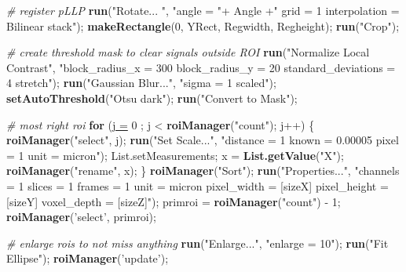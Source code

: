 \documentclass[11pt,singlespacinge,twoside]{reedthesis} %
\newenvironment{Shaded}{}{}
\newcommand{\CommentTok}[1]{\textit{#1}}
\newcommand{\ControlFlowTok}[1]{\textbf{#1}}
\newcommand{\DataTypeTok}[1]{\underline{#1}}
\newcommand{\DecValTok}[1]{#1}
\newcommand{\KeywordTok}[1]{\textbf{#1}}
\newcommand{\NormalTok}[1]{#1}
\newcommand{\OperatorTok}[1]{#1}
\newcommand{\StringTok}[1]{#1}
\theoremstyle{definition}
\theoremstyle{definition}
\theoremstyle{definition}
\theoremstyle{remark}
\begin{document}
\scriptsize
\begin{Shaded}
\begin{Highlighting}[numbers=left,,]
\CommentTok{# register pLLP}
    \KeywordTok{run}\NormalTok{(}\StringTok{"Rotate... "}\NormalTok{, }\StringTok{"angle = "}\OperatorTok{+}\StringTok{ }\NormalTok{Angle }\OperatorTok{+}\StringTok{" grid = 1 interpolation = Bilinear stack"}\NormalTok{);}
    \KeywordTok{makeRectangle}\NormalTok{(}\DecValTok{0}\NormalTok{, YRect, Regwidth, Regheight);}
    \KeywordTok{run}\NormalTok{(}\StringTok{"Crop"}\NormalTok{);}

\CommentTok{# create threshold mask to clear signals outside ROI}
    \KeywordTok{run}\NormalTok{(}\StringTok{"Normalize Local Contrast"}\NormalTok{, }\StringTok{"block_radius_x = 300 block_radius_y = 20 standard_deviations = 4 stretch"}\NormalTok{);}
    \KeywordTok{run}\NormalTok{(}\StringTok{"Gaussian Blur..."}\NormalTok{, }\StringTok{"sigma = 1 scaled"}\NormalTok{);}
    \KeywordTok{setAutoThreshold}\NormalTok{(}\StringTok{"Otsu dark"}\NormalTok{);}
    \KeywordTok{run}\NormalTok{(}\StringTok{"Convert to Mask"}\NormalTok{);}

\CommentTok{# most right roi}
    \ControlFlowTok{for}\NormalTok{ (}\DataTypeTok{j =} \DecValTok{0}\NormalTok{ ; j }\OperatorTok{<}\StringTok{ }\KeywordTok{roiManager}\NormalTok{(}\StringTok{"count"}\NormalTok{); j}\OperatorTok{++}\NormalTok{) \{}
        \KeywordTok{roiManager}\NormalTok{(}\StringTok{"select"}\NormalTok{, j);}
        \KeywordTok{run}\NormalTok{(}\StringTok{"Set Scale..."}\NormalTok{, }\StringTok{"distance = 1 known = 0.00005 pixel = 1 unit = micron"}\NormalTok{);}
\NormalTok{        List.setMeasurements;}
\NormalTok{    x =}\StringTok{ }\KeywordTok{List.getValue}\NormalTok{(}\StringTok{"X"}\NormalTok{);}
    \KeywordTok{roiManager}\NormalTok{(}\StringTok{"rename"}\NormalTok{, x);}
\NormalTok{    \}}
    \KeywordTok{roiManager}\NormalTok{(}\StringTok{"Sort"}\NormalTok{);}
    \KeywordTok{run}\NormalTok{(}\StringTok{"Properties..."}\NormalTok{, }
        \StringTok{"channels = 1 slices = 1 frames = 1 unit = micron pixel_width = [sizeX] pixel_height = [sizeY] voxel_depth = [sizeZ]"}\NormalTok{);}
\NormalTok{    primroi =}\StringTok{ }\KeywordTok{roiManager}\NormalTok{(}\StringTok{"count"}\NormalTok{) }\OperatorTok{-}\StringTok{ }\DecValTok{1}\NormalTok{;}
    \KeywordTok{roiManager}\NormalTok{(}\StringTok{'select'}\NormalTok{, primroi);}
    
\CommentTok{# enlarge rois to not miss anything}
    \KeywordTok{run}\NormalTok{(}\StringTok{"Enlarge..."}\NormalTok{, }\StringTok{"enlarge = 10"}\NormalTok{);}
    \KeywordTok{run}\NormalTok{(}\StringTok{"Fit Ellipse"}\NormalTok{);}
    \KeywordTok{roiManager}\NormalTok{(}\StringTok{'update'}\NormalTok{);}
\end{Highlighting}
\end{Shaded}
\normalsize
\end{document}
